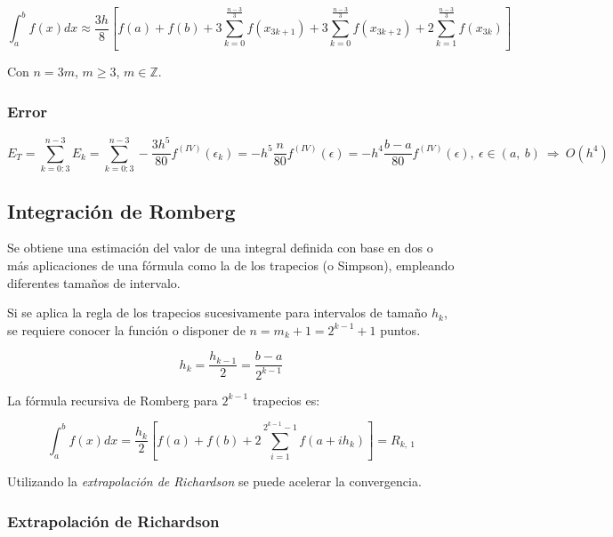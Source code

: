 \documentclass{article}
\begin{document}
\begin{equation*}
\int_{a}^{b} f(x)dx \approx
\frac{3h}{8}\left[ f(a) + f(b) + 3 \sum_{k=0}^{\frac{n-3}{3}} f(x_{3k+1}) 
+ 3 \sum_{k=0}^{\frac{n-3}{3}} f(x_{3k+2}) 
+ 2 \sum_{k=1}^{\frac{n-3}{3}} f(x_{3k})  \right]
\end{equation*}

Con $n = 3m$, $m\geq 3$, $m\in\mathbb{Z}$.

\subsubsection{Error}

\begin{equation*}
E_T = \sum_{k=0:3}^{n-3} E_k = 
\sum_{k=0:3}^{n-3} -\frac{3h^5}{80}f^{(IV)}(\epsilon_k) =
-h^5 \frac{n}{80} f^{(IV)}(\epsilon) =
-h^4 \frac{b-a}{80} f^{(IV)}(\epsilon),\ \epsilon\in(a,\ b)\ \Rightarrow\ O(h^4)
\end{equation*}

\subsection{Integración de Romberg}

Se obtiene una estimación del valor de una integral definida con base en dos o 
más aplicaciones de una fórmula como la de los trapecios (o Simpson), empleando
diferentes tamaños de intervalo.

Si se aplica la regla de los trapecios sucesivamente para intervalos de tamaño
$h_k$, se requiere conocer la función o disponer de $n=m_k+1=2^{k-1}+1$ puntos.

\begin{equation*}
h_k = \frac{h_{k-1}}{2} = \frac{b-a}{2^{k-1}}
\end{equation*}

La fórmula recursiva de Romberg para $2^{k-1}$ trapecios es:

\begin{equation*}
\int_{a}^{b} f(x)dx = 
\frac{h_k}{2} \left[ f(a) + f(b) + 2 \sum_{i=1}^{2^{k-1}-1} f(a + ih_k) \right]
= R_{k,\ 1}
\end{equation*}

Utilizando la \emph{extrapolación de Richardson} se puede acelerar la 
convergencia.

\subsubsection{Extrapolación de Richardson}
\end{document}
